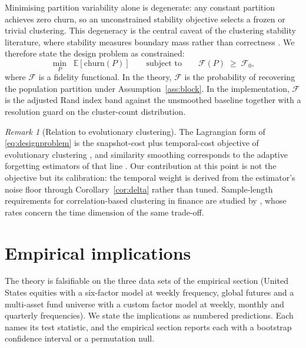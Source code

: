 \documentclass[11pt]{article}
\theoremstyle{remark}
\newtheorem{remark}{Remark}
\newcommand{\E}{\mathbb{E}}
\begin{document}
Minimising partition variability alone is degenerate: any constant partition
achieves zero churn, so an unconstrained stability objective selects a frozen
or trivial clustering. This degeneracy is the central caveat of the clustering
stability literature, where stability measures boundary mass rather than
correctness \citep{bendavid2006sober, vonluxburg2010clustering}. We therefore
state the design problem as constrained:
\begin{equation}
\min_{P} \;\; \E\!\left[\text{churn}(P)\right]
\qquad \text{subject to} \qquad
\mathcal{F}(P) \;\geq\; \mathcal{F}_0,
\label{eq:designproblem}
\end{equation}
where $\mathcal{F}$ is a fidelity functional. In the theory, $\mathcal{F}$ is
the probability of recovering the population partition under
Assumption~\ref{ass:block}. In the implementation, $\mathcal{F}$ is the
adjusted Rand index band against the unsmoothed baseline together with a
resolution guard on the cluster-count distribution.

\begin{remark}[Relation to evolutionary clustering]
\label{rem:evolutionary}
The Lagrangian form of \eqref{eq:designproblem} is the snapshot-cost plus
temporal-cost objective of evolutionary clustering
\citep{chakrabarti2006evolutionary}, and similarity smoothing corresponds to
the adaptive forgetting estimators of that line \citep{xu2014adaptive}. Our
contribution at this point is not the objective but its calibration: the
temporal weight is derived from the estimator's noise floor through
Corollary~\ref{cor:delta} rather than tuned. Sample-length requirements for
correlation-based clustering in finance are studied by
\citet{marti2016clustering}, whose rates concern the time dimension of the
same trade-off.
\end{remark}

\section{Empirical implications}

The theory is falsifiable on the three data sets of the empirical section
(United States equities with a six-factor model at weekly frequency, global
futures and a multi-asset fund universe with a custom factor model at weekly,
monthly and quarterly frequencies). We state the implications as numbered
predictions. Each names its test statistic, and the empirical section reports
each with a bootstrap confidence interval or a permutation null.
\end{document}
